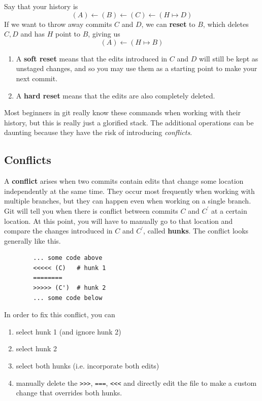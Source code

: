 \documentclass{article}
\begin{document}
    \begin{definition}[Reset] 
      Say that your history is 
      \begin{equation}
        (A) \leftarrow (B) \leftarrow (C) \leftarrow (H \mapsto D)
      \end{equation}  
      If we want to throw away commits $C$ and $D$, we can \textbf{reset} to $B$, which deletes $C, D$ and has $H$ point to $B$, giving us 
      \begin{equation}
        (A) \leftarrow (H \mapsto B)
      \end{equation} 
      \begin{enumerate}
        \item A \textbf{soft reset} means that the edits introduced in $C$ and $D$ will still be kept as unstaged changes, and so you may use them as a starting point to make your next commit. 
        \item A \textbf{hard reset} means that the edits are also completely deleted. 
      \end{enumerate}
    \end{definition} 

    Most beginners in git really know these commands when working with their history, but this is really just a glorified stack. The additional operations can be daunting because they have the risk of introducing \textit{conflicts}. 

  \subsection{Conflicts} 

    \begin{definition}[Conflicts]
      A \textbf{conflict} arises when two commits contain edits that change some location independently at the same time. They occur most frequently when working with multiple branches, but they can happen even when working on a single branch. Git will tell you when there is conflict between commits $C$ and $C^\prime$ at a certain location. At this point, you will have to manually go to that location and compare the changes introduced in $C$ and $C^\prime$, called \textbf{hunks}. The conflict looks generally like this. 
      \begin{lstlisting}
        ... some code above 
        <<<<< (C)   # hunk 1
        ========
        >>>>> (C')  # hunk 2
        ... some code below
      \end{lstlisting} 

      In order to fix this conflict, you can  
      \begin{enumerate}
        \item select hunk 1 (and ignore hunk 2)
        \item select hunk 2 
        \item select both hunks (i.e. incorporate both edits) 
        \item manually delete the \texttt{>>>}, \texttt{===}, \texttt{<<<} and directly edit the file to make a custom change that overrides both hunks. 
      \end{enumerate} 
    \end{definition} 
\end{document}
